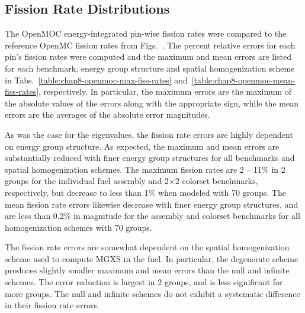\subsection{Fission Rate Distributions}
\label{subsec:chap8-fiss-rates}

The OpenMOC energy-integrated pin-wise fission rates were compared to the reference OpenMC fission rates from Figs.~. The percent relative errors for each pin's fission rates were computed and the maximum and mean errors are listed for each benchmark, energy group structure and spatial homogenization scheme in Tabs.~\ref{table:chap8-openmoc-max-fiss-rates} and~\ref{table:chap8-openmoc-mean-fiss-rates}, respectively. In particular, the maximum errors are the maximum of the absolute values of the errors along with the appropriate sign, while the mean errors are the averages of the absolute error magnitudes.

As was the case for the eigenvalues, the fission rate errors are highly dependent on energy group structure. As expected, the maximum and mean errors are substantially reduced with finer energy group structures for all benchmarks and spatial homogenization schemes. The maximum fission rates are 2 -- 11\% in 2 groups for the individual fuel assembly and 2$\times$2 colorset benchmarks, respectively, but decrease to less than 1\% when modeled with 70 groups. The mean fission rate errors likewise decrease with finer energy group structures, and are less than 0.2\% in magnitude for the assembly and colorset benchmarks for all homogenization schemes with 70 groups.

The fission rate errors are somewhat dependent on the spatial homogenization scheme used to compute \ac{MGXS} in the fuel. In particular, the degenerate scheme produces slightly smaller maximum and mean errors than the null and infinite schemes. The error reduction is largest in 2 groups, and is less significant for more groups. The null and infinite schemes do not exhibit a systematic difference in their fission rate errors.


